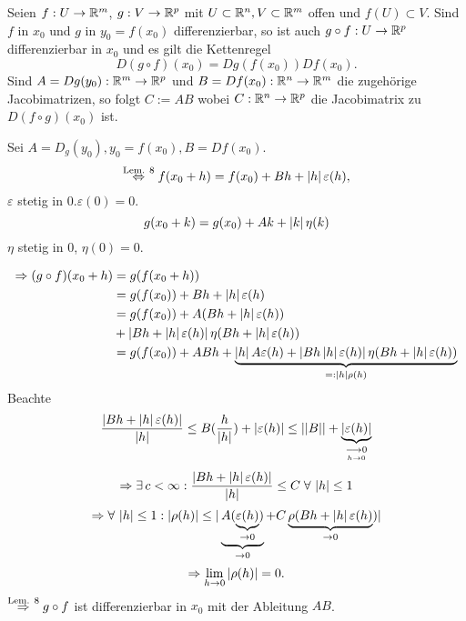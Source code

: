 \documentclass[../ana2.tex]{subfiles}
\begin{document}
\begin{satz}[Kettenregel]
    Seien \( f:U\rightarrow \mathbb{R}^m \), 
    \( g:V\rightarrow \mathbb{R}^p \)
    mit \( U \subset \mathbb{R}^n, V \subset \mathbb{R}^m \)
    offen und \( f(U) \subset V \).
    Sind \(f\) in \(x_0\) und \(g\) in \(y_0 = f(x_0)\)
    differenzierbar, so ist auch \(g \circ f:U\rightarrow \mathbb{R}^p\)
    differenzierbar in \(x_0\) und es gilt die 
    Kettenregel 
    \[ D(g\circ f)(x_0) = D g(f(x_0))Df(x_0). \]
    Sind \( A = Dg(y_0):\mathbb{R}^m\rightarrow \mathbb{R}^p \) und 
    \( B = Df(x_0):\mathbb{R}^n\rightarrow \mathbb{R}^m \)
    die zugehörige Jacobimatrizen, so folgt 
    \( C := AB \)
    wobei
    \( C:\mathbb{R}^n\rightarrow \mathbb{R}^p \) 
    die Jacobimatrix zu \( D(f \circ g)(x_0) \) ist.
\end{satz}
\begin{bew}
    Sei \(A = D_g(y_0), y_0 = f(x_0), B = Df(x_0) \).
    \[ \overset{\text{Lem. 8}}{\Leftrightarrow} 
    f(x_0 + h) = f(x_0) + Bh + \left|h\right| \varepsilon(h), \]
    \( \varepsilon \) stetig in \(0. \varepsilon(0) = 0\).
    \[ g(x_0 + k) = g(x_0) + Ak + \left|k\right| \eta(k) \]
    \( \eta \) stetig in \( 0 \), \( \eta(0) = 0 \).

    \begin{align*}
        \Rightarrow (g \circ f)(x_0 + h) &= g(f(x_0 + h))\\
        &= g(f(x_0)) + Bh + \left|h\right|\varepsilon(h) \\
        &= g(f(x_0)) + A(Bh + \left|h\right|\varepsilon(h)) \\
        &+ \left| Bh + \left|h\right|\varepsilon(h) \right| \eta (Bh + \left|h\right|\varepsilon(h)) \\
        &= g(f(x_0)) + ABh + \underbrace{\left|h\right| A \varepsilon(h) + \left|Bh \left|h\right|\varepsilon(h)\right| \eta (Bh + \left|h\right|\varepsilon(h))}_{=:\left|h\right|\rho(h)}
    \end{align*}
    Beachte 
    \[ \frac{\left| Bh + \left|h\right|\varepsilon(h) \right|}{\left|h\right|}
    \leq B(\frac{h}{\left|h\right|}) + \left|\varepsilon(h)\right| 
    \leq \left|\left|B\right|\right| + \underbrace{\left|\varepsilon(h)\right|}_{\underset{h \rightarrow 0}{\longrightarrow 0}} \]
    \[ \Rightarrow \exists c < \infty: \frac{\abs{Bh + \abs{h}\varepsilon(h)}}{\abs{h}} 
    \leq C \; \forall \abs{h} \leq 1 \]
    \[ \Rightarrow \forall \abs{h} \leq 1: 
    \abs{\rho(h)} \leq | \underbrace{A(\underbrace{\varepsilon(h)}_{\rightarrow 0})}_{\rightarrow 0} 
    + C\underbrace{\rho (Bh + \abs{h}\varepsilon(h)}_{\rightarrow 0}) | \]    
    \[ \Rightarrow \lim\limits_{h\rightarrow{}0} \left|\rho(h)\right| = 0. \]
    \( \overset{\text{Lem. 8}}{\Rightarrow} g \circ f \) 
    ist differenzierbar in \(x_0\) mit der Ableitung \( AB \).
\end{bew}
\end{document}
